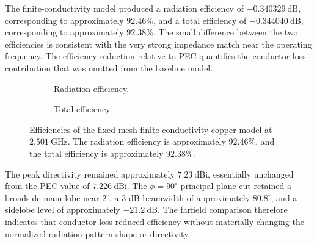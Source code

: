 The finite-conductivity model produced a radiation efficiency of
\(-0.340329~\mathrm{dB}\), corresponding to approximately \(92.46\%\), and a total efficiency of
\(-0.344040~\mathrm{dB}\), corresponding to approximately \(92.38\%\). The small difference between
the two efficiencies is consistent with the very strong impedance match near the operating frequency.
The efficiency reduction relative to PEC quantifies the conductor-loss contribution that was omitted
from the baseline model.

\begin{figure}[H]
    \centering
    \begin{subfigure}[t]{0.49\textwidth}
        \centering
        \caption{Radiation efficiency.}
        \label{fig:single-patch-copper-rad-eff}
    \end{subfigure}
    \hfill
    \begin{subfigure}[t]{0.49\textwidth}
        \centering
        \caption{Total efficiency.}
        \label{fig:single-patch-copper-tot-eff}
    \end{subfigure}
    \caption[Finite-conductivity single-patch efficiencies.]{Efficiencies of the fixed-mesh finite-conductivity copper model at \(2.501~\mathrm{GHz}\). The radiation efficiency is approximately \(92.46\%\), and the total efficiency is approximately \(92.38\%\).}
    \label{fig:single-patch-copper-efficiencies}
\end{figure}

The peak directivity remained approximately \(7.23~\mathrm{dBi}\), essentially unchanged from the
PEC value of \(7.226~\mathrm{dBi}\). The \(\phi=90^\circ\) principal-plane cut retained a broadside
main lobe near \(2^\circ\), a 3-dB beamwidth of approximately \(80.8^\circ\), and a sidelobe level of
approximately \(-21.2~\mathrm{dB}\). The farfield comparison therefore indicates that conductor loss
reduced efficiency without materially changing the normalized radiation-pattern shape or directivity.


